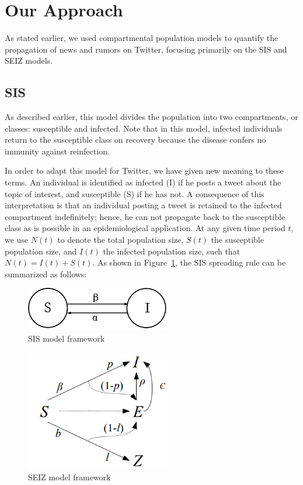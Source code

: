 \section{Our Approach}
As stated earlier, we used compartmental population models to quantify the propagation of news and rumors on Twitter, focusing primarily on the SIS and SEIZ models.

\subsection{SIS}
As described earlier, this model divides the population into two compartments, or classes: susceptible and infected.
Note that in this model, infected individuals return to the susceptible class on recovery because the disease confers no immunity against reinfection.


In order to adapt this model for Twitter, we have given new meaning to these terms. An individual is identified as infected (I) if he posts a tweet about the topic of interest, and susceptible (S) if he has not. A consequence of this interpretation is that an individual posting a tweet is retained to the infected compartment indefinitely; hence, he can not propagate back to the susceptible class as is possible in an epidemiological application. At any given time period $t$, we use $N(t)$ to denote the total population size, $S(t)$ the susceptible population size, and $I(t)$ the infected population size, such that $N(t) = I(t) + S(t)$. As shown in Figure~\ref{fig:sis-framework}, the SIS spreading rule can be summarized as follows:

\begin{figure}[ht]
\centering
\includegraphics[width=2.5in]{pictures/SIS.png} %
\vspace{-1em}
\caption{SIS model framework}
\label{fig:sis-framework}
\end{figure}


\begin{figure}[ht]
\centering
\includegraphics[width=2.5in]{pictures/SEIZ.png} %
\vspace{-1em}
\caption{SEIZ model framework}
\label{fig:seiz-framework}
\end{figure}


